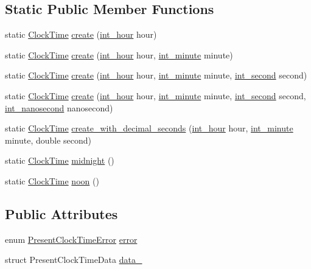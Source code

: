 \subsection*{\-Static \-Public \-Member \-Functions}
\begin{DoxyCompactItemize}
\item 
static \hyperlink{structClockTime}{\-Clock\-Time} \hyperlink{structClockTime_a72284f0c4f53d026688e55cea607f219}{create} (\hyperlink{types_8h_afc81a27a9c08f0790f17b34bdf95cdb7}{int\-\_\-hour} hour)
\item 
static \hyperlink{structClockTime}{\-Clock\-Time} \hyperlink{structClockTime_aa4429a92963b67343bc6eab885938a5a}{create} (\hyperlink{types_8h_afc81a27a9c08f0790f17b34bdf95cdb7}{int\-\_\-hour} hour, \hyperlink{types_8h_ae648329a919e6d860ef5ef2aac4ffb86}{int\-\_\-minute} minute)
\item 
static \hyperlink{structClockTime}{\-Clock\-Time} \hyperlink{structClockTime_a3a34039699358c31a6f68d545f228728}{create} (\hyperlink{types_8h_afc81a27a9c08f0790f17b34bdf95cdb7}{int\-\_\-hour} hour, \hyperlink{types_8h_ae648329a919e6d860ef5ef2aac4ffb86}{int\-\_\-minute} minute, \hyperlink{types_8h_acdee90940aea1c6f3e71652fb525a987}{int\-\_\-second} second)
\item 
static \hyperlink{structClockTime}{\-Clock\-Time} \hyperlink{structClockTime_afdf4e7a0b63e536f24a5eb85a3eb1ae8}{create} (\hyperlink{types_8h_afc81a27a9c08f0790f17b34bdf95cdb7}{int\-\_\-hour} hour, \hyperlink{types_8h_ae648329a919e6d860ef5ef2aac4ffb86}{int\-\_\-minute} minute, \hyperlink{types_8h_acdee90940aea1c6f3e71652fb525a987}{int\-\_\-second} second, \hyperlink{types_8h_a2a3f766e7346eb6ae01022cd28128ea6}{int\-\_\-nanosecond} nanosecond)
\item 
static \hyperlink{structClockTime}{\-Clock\-Time} \hyperlink{structClockTime_a71e4e398da2cb0cfd3adb3f87cb6f3c2}{create\-\_\-with\-\_\-decimal\-\_\-seconds} (\hyperlink{types_8h_afc81a27a9c08f0790f17b34bdf95cdb7}{int\-\_\-hour} hour, \hyperlink{types_8h_ae648329a919e6d860ef5ef2aac4ffb86}{int\-\_\-minute} minute, double second)
\item 
static \hyperlink{structClockTime}{\-Clock\-Time} \hyperlink{structClockTime_a7baab35d60ad3a2236c14133d8d0083b}{midnight} ()
\item 
static \hyperlink{structClockTime}{\-Clock\-Time} \hyperlink{structClockTime_ae206b86808ff1d0158cbc920eb289797}{noon} ()
\end{DoxyCompactItemize}
\subsection*{\-Public \-Attributes}
\begin{DoxyCompactItemize}
\item 
enum \hyperlink{clock-time_8h_a40f97cceae12156ea6da9bd1c170d455}{\-Present\-Clock\-Time\-Error} \hyperlink{structClockTime_a58f5305f36468eee0d1c489b5d72d717}{error}
\item 
struct \-Present\-Clock\-Time\-Data \hyperlink{structClockTime_a3fe115dffef3ba153e1fff6e0b2c0a23}{data\-\_\-}
\end{DoxyCompactItemize}
